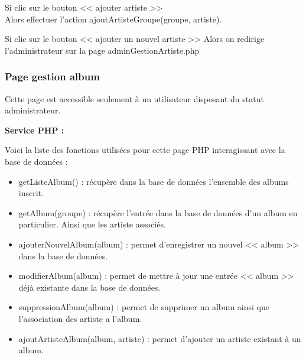 \begin{paragraphe}
			\begin{paragraphe}
				Si clic sur le bouton << ajouter artiste >> \\
				Alors effectuer l'action ajoutArtisteGroupe(groupe, artiste).
			\end{paragraphe}

			\begin{paragraphe}
				Si clic sur le bouton << ajouter un nouvel artiste >>
				Alors on redirige l'administrateur sur la page adminGestionArtiste.php
			\end{paragraphe}

		\subsubsection{Page gestion album}

			\begin{paragraphe}
				Cette page est accessible seulement à un utilisateur disposant du statut administrateur.
			\end{paragraphe}

			\begin{paragraphe}
				\textbf{Service PHP :}
			\end{paragraphe}

			\begin{paragraphe}
				Voici la liste des fonctions utilisées pour cette page PHP interagissant avec la base de données :
			\end{paragraphe}

			\begin{paragraphe}
				\begin{itemize}
					\item getListeAlbum() : récupère dans la base de données l'ensemble des albums inscrit.
					\item getAlbum(groupe) : récupère l'entrée dans la base de données d'un album en particulier. Ainsi que les artiste associés.
					\item ajouterNouvelAlbum(album) : permet d'enregistrer un nouvel << album >> dans la base de données.
					\item modifierAlbum(album) : permet de mettre à jour une entrée << album >> déjà existante dans la base de données.
					\item suppressionAlbum(album) : permet de supprimer un album ainsi que l'association des artiste a l'album.
					\item ajoutArtisteAlbum(album, artiste) : permet d'ajouter un artiste existant à un album.
				\end{itemize}
			\end{paragraphe}


\end{paragraphe}
